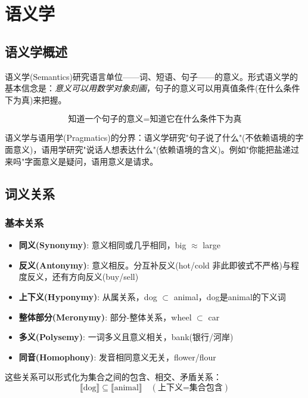 \clearpage
\vspace*{\fill}
\section{语义学}
\vspace*{\fill}
\clearpage


\subsection{语义学概述}

语义学(Semantics)研究语言单位——词、短语、句子——的意义。形式语义学的基本信念是：\emph{意义可以用数学对象刻画}，句子的意义可以用真值条件(在什么条件下为真)来把握。

\begin{equation}
    \text{知道一个句子的意义} = \text{知道它在什么条件下为真}
\end{equation}

语义学与语用学(Pragmatics)的分界：语义学研究"句子说了什么"(不依赖语境的字面意义)，语用学研究"说话人想表达什么"(依赖语境的含义)。例如"你能把盐递过来吗"字面意义是疑问，语用意义是请求。

\subsection{词义关系}

\subsubsection{基本关系}

\begin{itemize}
    \item \textbf{同义(Synonymy)}: 意义相同或几乎相同，big $\approx$ large
    \item \textbf{反义(Antonymy)}: 意义相反。分互补反义(hot/cold 非此即彼式不严格)与程度反义，还有方向反义(buy/sell)
    \item \textbf{上下义(Hyponymy)}: 从属关系，dog $\subset$ animal，dog是animal的下义词
    \item \textbf{整体部分(Meronymy)}: 部分-整体关系，wheel $\subset$ car
    \item \textbf{多义(Polysemy)}: 一词多义且意义相关，bank(银行/河岸)
    \item \textbf{同音(Homophony)}: 发音相同意义无关，flower/flour
\end{itemize}

这些关系可以形式化为集合之间的包含、相交、矛盾关系：
\begin{equation}
    \llbracket \text{dog} \rrbracket \subseteq \llbracket \text{animal} \rrbracket \quad (\text{上下义=集合包含})
\end{equation}

